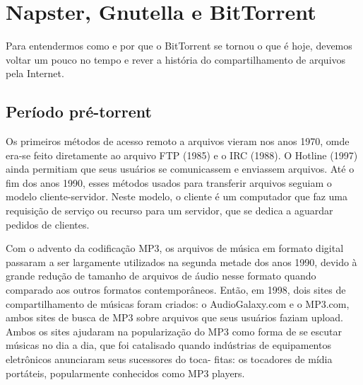 
\chapter{Napster, Gnutella e BitTorrent}

\begin{comment}
Vou contar a história do BitTorrent, desde o aumento do uso de
transferências de dados via internet, passando pela criação de protocolos e softwares
usados para baixar arquivos de forma ilegal, até a sua criação e o boom de usuários que
o utilizam para essa motivação. Em paralelo, discutirei os motivos legais pelos quais os
softwares anteriores foram descontinuados, que influenciaram diretamente na sua criação.

Separarei em 3 períodos: o antes, a criação e as consequências disso no mundo.
\end{comment}

Para entendermos como e por que o BitTorrent se tornou o que é hoje, devemos voltar um
pouco no tempo e rever a história do compartilhamento de arquivos pela Internet.

\section{Período pré-torrent}

Os primeiros métodos de acesso remoto a arquivos vieram nos anos 1970, omde era-se feito diretamente ao arquivo FTP (1985) e o
IRC (1988). O Hotline (1997) ainda permitiam que seus usuários se comunicassem e
enviassem arquivos. Até o fim dos anos 1990, esses métodos usados para transferir arquivos seguiam
o modelo cliente-servidor. Neste modelo, o cliente é um computador que faz uma requisição
de serviço ou recurso para um servidor, que se dedica a aguardar pedidos de clientes.

Com o advento da codificação MP3, os arquivos de música em formato digital passaram a ser
largamente utilizados na segunda metade dos anos 1990, devido à grande redução de tamanho
de arquivos de áudio nesse formato quando comparado aos outros formatos contemporâneos.
Então, em 1998, dois sites de compartilhamento de músicas foram criados: o
AudioGalaxy.com e o MP3.com, ambos sites de busca de MP3 sobre arquivos que seus usuários
faziam upload. Ambos os sites ajudaram na popularização do MP3 como forma de se escutar
músicas no dia a dia, que foi catalisado quando indústrias de equipamentos eletrônicos
anunciaram seus sucessores do toca- fitas: os tocadores de mídia portáteis, popularmente
conhecidos como MP3 players.

